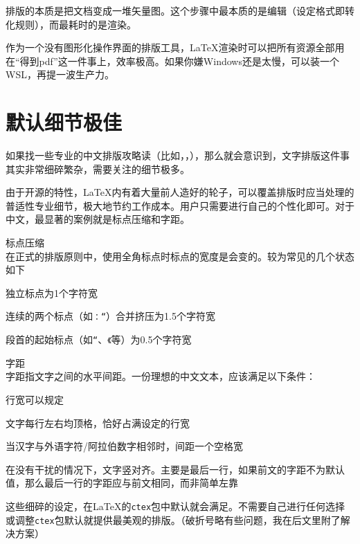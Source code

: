 \documentclass[10pt,openany]{book}
\begin{document}
排版的本质是把文档变成一堆矢量图。这个步骤中最本质的是编辑（设定格式即转化规则），而最耗时的是渲染。

作为一个没有图形化操作界面的排版工具，{\LaTeX}渲染时可以把所有资源全部用在“得到pdf”这一件事上，效率极高。如果你嫌Windows还是太慢，可以装一个WSL，再提一波生产力。

\section{默认细节极佳}

如果找一些专业的中文排版攻略读（比如，，），那么就会意识到，文字排版这件事其实非常细碎繁杂，需要关注的细节极多。

由于开源的特性，{\LaTeX}内有着大量前人造好的轮子，可以覆盖排版时应当处理的普适性专业细节，极大地节约工作成本。用户只需要进行自己的个性化即可。对于中文，最显著的案例就是标点压缩和字距。

\begin{tightitem}
    \item 标点压缩\\在正式的排版原则中，使用全角标点时标点的宽度是会变的。较为常见的几个状态如下
    \begin{tightenum}
        \item 独立标点为1个字符宽
        \item 连续的两个标点（如\texttt{：“}）合并挤压为1.5个字符宽
        \item 段首的起始标点（如\texttt{“}、\texttt{《}等）为0.5个字符宽
    \end{tightenum}
    \item 字距\\字距指文字之间的水平间距。一份理想的中文文本，应该满足以下条件：
    \begin{tightenum}
        \item 行宽可以规定
        \item 文字每行左右均顶格，恰好占满设定的行宽
        \item 当汉字与外语字符/阿拉伯数字相邻时，间距一个空格宽
        \item 在没有干扰的情况下，文字竖对齐。主要是最后一行，如果前文的字距不为默认值，那么最后一行的字距应与前文相同，而非简单左靠
    \end{tightenum}
\end{tightitem}

这些细碎的设定，在{\LaTeX}的\texttt{ctex}包中默认就会满足。不需要自己进行任何选择或调整\texttt{ctex}包默认就提供最美观的排版。（破折号略有些问题，我在后文里附了解决方案）
\end{document}
